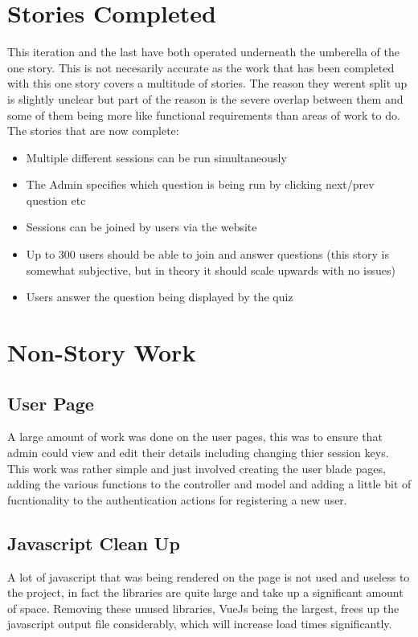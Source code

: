 \documentclass{article}
\begin{document}
\section{Stories Completed}
This iteration and the last have both operated underneath the umberella of the one story. This is not necesarily accurate as the work that has been completed with this one story covers a multitude of stories. The reason they werent split up is slightly unclear but part of the reason is the severe overlap between them and some of them being more like functional requirements than areas of work to do. The stories that are now complete:
\begin{itemize}
	\item Multiple different sessions can be run simultaneously
	\item The Admin specifies which question is being run by clicking next/prev question etc
	\item Sessions can be joined by users via the website
	\item Up to 300 users should be able to join and answer questions (this story is somewhat subjective, but in theory it should scale upwards with no issues)
	\item Users answer the question being displayed by the quiz
\end{itemize}
\newpage

\section{Non-Story Work}
\subsection{User Page}
A large amount of work was done on the user pages, this was to ensure that admin could view and edit their details including changing thier session keys. This work was rather simple and just involved creating the user blade pages, adding the various functions to the controller and model and adding a little bit of fucntionality to the authentication actions for registering a new user.
\subsection{Javascript Clean Up}
A lot of javascript that was being rendered on the page is not used and useless to the project, in fact the libraries are quite large and take up a significant amount of space. Removing these unused libraries, VueJs being the largest, frees up the javascript output file considerably, which will increase load times significantly.

%
%
\end{document}
